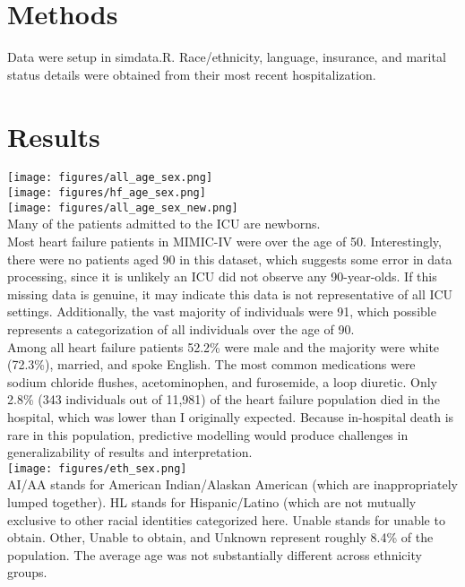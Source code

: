 \documentclass{article}
\begin{document}
\section{Methods}
Data were setup in simdata.R. Race/ethnicity, language, insurance, and marital status details were obtained from their most recent hospitalization. 
\section{Results}
\texttt{[image: figures/all\_age\_sex.png]}\\
\texttt{[image: figures/hf\_age\_sex.png]}\\
\texttt{[image: figures/all\_age\_sex\_new.png]}\\
Many of the patients admitted to the ICU are newborns.\\
Most heart failure patients in MIMIC-IV were over the age of 50. Interestingly, there were no patients aged 90 in this dataset, which suggests some error in data processing, since it is unlikely an ICU did not observe any 90-year-olds. If this missing data is genuine, it may indicate this data is not representative of all ICU settings. Additionally, the vast majority of individuals were 91, which possible represents a categorization of all individuals over the age of 90.\\
Among all heart failure patients 52.2\% were male and the majority were white (72.3\%), married, and spoke English. The most common medications were sodium chloride flushes, acetominophen, and furosemide, a loop diuretic. Only 2.8\% (343 individuals out of 11,981) of the heart failure population died in the hospital, which was lower than I originally expected. Because in-hospital death is rare in this population, predictive modelling would produce challenges in generalizability of results and interpretation.\\
\texttt{[image: figures/eth\_sex.png]}\\
AI/AA stands for American Indian/Alaskan American (which are inappropriately lumped together). HL stands for Hispanic/Latino (which are not mutually exclusive to other racial identities categorized here. Unable stands for unable to obtain. Other, Unable to obtain, and Unknown represent roughly 8.4\% of the population. The average age was not substantially different across ethnicity groups.
\end{document}
